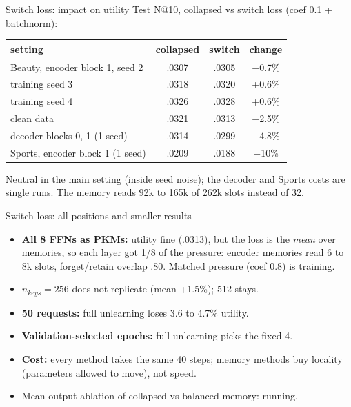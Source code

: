 \documentclass{beamer}
\begin{document}
\begin{frame}{Switch loss: impact on utility}
Test N@10, collapsed vs switch loss (coef 0.1 + batchnorm):
\begin{center}
\footnotesize\setlength{\tabcolsep}{4pt}
\begin{tabular}{|l|c|c|c|}
\hline
setting & collapsed & switch & change \\
\hline
Beauty, encoder block 1, seed 2 & .0307 & .0305 & $-$0.7\% \\
training seed 3                 & .0318 & .0320 & +0.6\% \\
training seed 4                 & .0326 & .0328 & +0.6\% \\
clean data                      & .0321 & .0313 & $-$2.5\% \\
decoder blocks 0, 1 (1 seed)    & .0314 & .0299 & $-$4.8\% \\
Sports, encoder block 1 (1 seed) & .0209 & .0188 & $-$10\% \\
\hline
\end{tabular}
\end{center}
Neutral in the main setting (inside seed noise); the decoder and Sports costs
are single runs. The memory reads 92k to 165k of 262k slots instead of 32.
\end{frame}

\begin{frame}{Switch loss: all positions and smaller results}
\begin{itemize}
  \item \textbf{All 8 FFNs as PKMs:} utility fine (.0313), but the loss is the
        \emph{mean} over memories, so each layer got 1/8 of the pressure:
        encoder memories read 6 to 8k slots, forget/retain overlap .80.
        Matched pressure (coef 0.8) is training.
  \item $n_{keys}=256$ does not replicate (mean +1.5\%); 512 stays.
  \item \textbf{50 requests:} full unlearning loses 3.6 to 4.7\% utility.
  \item \textbf{Validation-selected epochs:} full unlearning picks the fixed 4.
  \item \textbf{Cost:} every method takes the same 40 steps; memory methods buy
        locality (parameters allowed to move), not speed.
  \item Mean-output ablation of collapsed vs balanced memory: running.
\end{itemize}
\end{frame}
\end{document}
